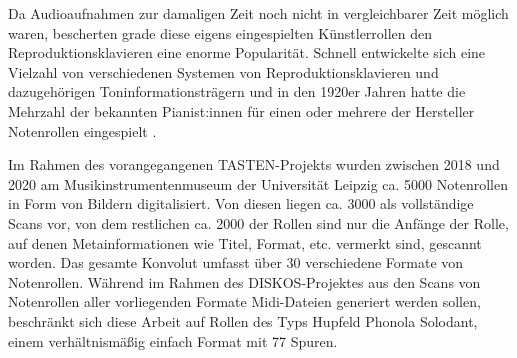 Da Audioaufnahmen zur damaligen Zeit noch nicht in vergleichbarer Zeit möglich waren, bescherten grade diese eigens eingespielten Künstlerrollen den Reproduktionsklavieren eine enorme Popularität.
Schnell entwickelte sich eine Vielzahl von verschiedenen Systemen von Reproduktionsklavieren und dazugehörigen Toninformationsträgern und in den 1920er Jahren hatte die Mehrzahl der bekannten Pianist:innen für einen oder mehrere der Hersteller Notenrollen eingespielt \parencite[]{bowers_1972}.

Im Rahmen des vorangegangenen TASTEN-Projekts wurden zwischen 2018 und 2020 am Musikinstrumentenmuseum der Universität Leipzig ca. 5000 Notenrollen in Form von Bildern digitalisiert.
Von diesen liegen ca. 3000 als vollständige Scans vor, von dem restlichen ca. 2000 der Rollen sind nur die Anfänge der Rolle, auf denen Metainformationen wie Titel, Format, etc. vermerkt sind, gescannt worden.
Das gesamte Konvolut umfasst über 30 verschiedene Formate von Notenrollen.
Während im Rahmen des DISKOS-Projektes aus den Scans von Notenrollen aller vorliegenden Formate Midi-Dateien generiert werden sollen, beschränkt sich diese Arbeit auf Rollen des Typs Hupfeld Phonola Solodant, einem verhältnismäßig einfach Format mit 77 Spuren.